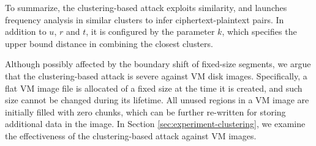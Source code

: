 To summarize, the clustering-based attack exploits similarity, and launches frequency analysis in similar clusters to infer ciphertext-plaintext pairs. In addition to  $u$, $r$ and $t$, it is configured by the parameter $k$, which specifies the upper bound distance in combining the closest clusters.   

Although possibly affected by the boundary shift of fixed-size segments, we argue that the clustering-based attack is severe against VM disk images. Specifically, a flat VM image file is allocated of a fixed size at the time it is created, and such size cannot be changed during its lifetime. All unused regions in a VM image are initially filled with  zero chunks, which can be further re-written for storing additional data in the image. In Section \ref{sec:experiment-clustering}, we examine the effectiveness of the clustering-based attack against VM images.


